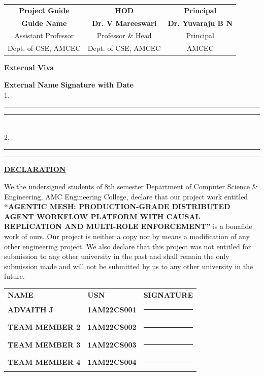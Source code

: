 \documentclass[12pt,a4paper]{report}
\begin{document}
\noindent
\begin{tabular*}{\textwidth}{@{\extracolsep{\fill}}ccc}
    \textbf{Project Guide} & \textbf{HOD} & \textbf{Principal} \\[8pt]
    \textbf{Guide Name} & \textbf{Dr. V Mareeswari} & \textbf{Dr. Yuvaraju B N} \\
    Assistant Professor & Professor \& Head & Principal \\
    Dept. of CSE, AMCEC & Dept. of CSE, AMCEC & AMCEC \\
\end{tabular*}

\vspace{50pt}
\begin{center}
    \textbf{\underline{External Viva}}
\end{center}
\vspace{10pt}
\noindent
\textbf{External Name} \hfill \textbf{Signature with Date} \\
1. \rule{6cm}{0.4pt} \hfill \rule{4cm}{0.4pt} \\[12pt]
2. \rule{6cm}{0.4pt} \hfill \rule{4cm}{0.4pt}

\newpage
\begin{center}
    {\large \textbf{\underline{DECLARATION}}}\\[25pt]
\end{center}

\noindent
We the undersigned students of 8th semester Department of Computer Science \& Engineering, AMC Engineering College, declare that our project work entitled \textbf{“AGENTIC MESH: PRODUCTION-GRADE DISTRIBUTED AGENT WORKFLOW PLATFORM WITH CAUSAL REPLICATION AND MULTI-ROLE ENFORCEMENT”} is a bonafide work of ours. Our project is neither a copy nor by means a modification of any other engineering project. We also declare that this project was not entitled for submission to any other university in the past and shall remain the only submission made and will not be submitted by us to any other university in the future.\\[40pt]

\noindent
\begin{tabularx}{\textwidth}{l X r}
    \textbf{NAME} & \textbf{USN} & \textbf{SIGNATURE} \\[12pt]
    \textbf{ADVAITH J} & \textbf{1AM22CS001} & \rule{4cm}{0.4pt} \\[15pt]
    \textbf{TEAM MEMBER 2} & \textbf{1AM22CS002} & \rule{4cm}{0.4pt} \\[15pt]
    \textbf{TEAM MEMBER 3} & \textbf{1AM22CS003} & \rule{4cm}{0.4pt} \\[15pt]
    \textbf{TEAM MEMBER 4} & \textbf{1AM22CS004} & \rule{4cm}{0.4pt} \\
\end{tabularx}
\end{document}
